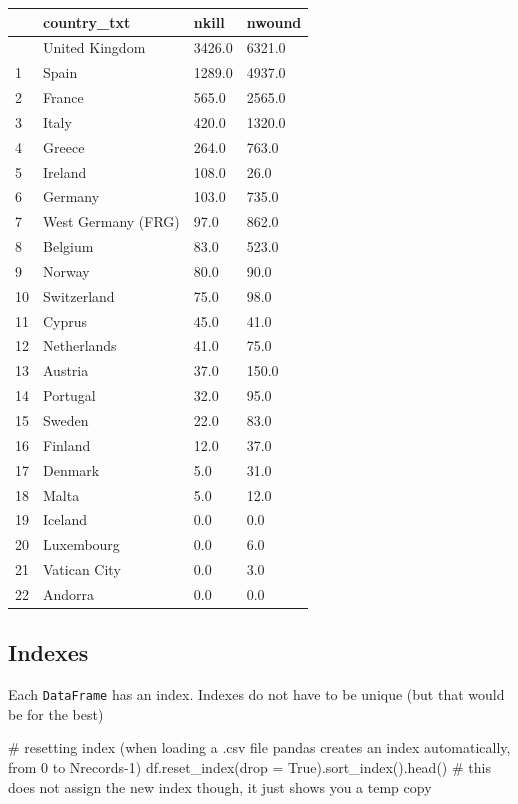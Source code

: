 \documentclass[
  letterpaper,
  DIV=11,
  numbers=noendperiod]{scrreprt}
\newenvironment{Shaded}{\begin{snugshade}}{\end{snugshade}}
\newcommand{\CommentTok}[1]{\textcolor[rgb]{0.37,0.37,0.37}{#1}}
\newcommand{\NormalTok}[1]{\textcolor[rgb]{0.00,0.23,0.31}{#1}}
\newcommand{\OperatorTok}[1]{\textcolor[rgb]{0.37,0.37,0.37}{#1}}
\newcommand{\VariableTok}[1]{\textcolor[rgb]{0.07,0.07,0.07}{#1}}
\begin{document}
\begin{longtable}[]{@{}llll@{}}
\toprule\noalign{}
& country\_txt & nkill & nwound \\
\midrule\noalign{}
\endhead
\bottomrule\noalign{}
\endlastfoot
0 & United Kingdom & 3426.0 & 6321.0 \\
1 & Spain & 1289.0 & 4937.0 \\
2 & France & 565.0 & 2565.0 \\
3 & Italy & 420.0 & 1320.0 \\
4 & Greece & 264.0 & 763.0 \\
5 & Ireland & 108.0 & 26.0 \\
6 & Germany & 103.0 & 735.0 \\
7 & West Germany (FRG) & 97.0 & 862.0 \\
8 & Belgium & 83.0 & 523.0 \\
9 & Norway & 80.0 & 90.0 \\
10 & Switzerland & 75.0 & 98.0 \\
11 & Cyprus & 45.0 & 41.0 \\
12 & Netherlands & 41.0 & 75.0 \\
13 & Austria & 37.0 & 150.0 \\
14 & Portugal & 32.0 & 95.0 \\
15 & Sweden & 22.0 & 83.0 \\
16 & Finland & 12.0 & 37.0 \\
17 & Denmark & 5.0 & 31.0 \\
18 & Malta & 5.0 & 12.0 \\
19 & Iceland & 0.0 & 0.0 \\
20 & Luxembourg & 0.0 & 6.0 \\
21 & Vatican City & 0.0 & 3.0 \\
22 & Andorra & 0.0 & 0.0 \\
\end{longtable}

\subsection{Indexes}\label{indexes}

Each \texttt{DataFrame} has an index. Indexes do not have to be unique
(but that would be for the best)

\begin{Shaded}
\begin{Highlighting}[]
\CommentTok{\# resetting index (when loading a .csv file pandas creates an index automatically, from 0 to Nrecords{-}1)}
\NormalTok{df.reset\_index(drop }\OperatorTok{=} \VariableTok{True}\NormalTok{).sort\_index().head() }\CommentTok{\# this does not assign the new index though, it just shows you a temp copy}
\end{Highlighting}
\end{Shaded}
\end{document}
